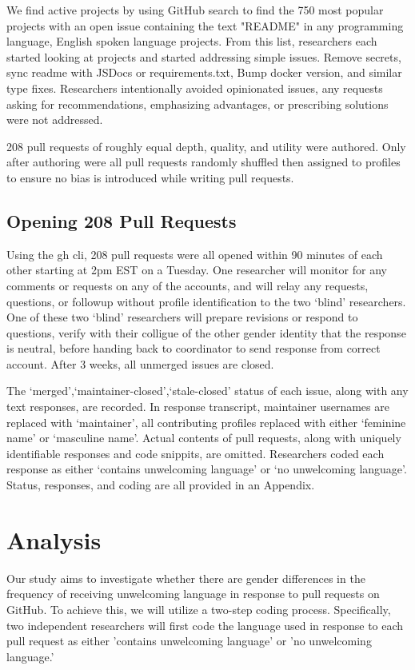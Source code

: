 \documentclass[journal,12pt,onecolumn,]{IEEEtran}
\begin{document}
We find active projects by using GitHub search to find the 750 most popular projects with an open issue containing the text "README" in any programming language, English spoken language projects.
From this list, researchers each started looking at projects and started addressing simple issues.
Remove secrets, sync readme with JSDocs or requirements.txt, Bump docker version, and similar type fixes.
Researchers intentionally avoided opinionated issues, any requests asking for recommendations, emphasizing advantages, or prescribing solutions were not addressed.

208 pull requests of roughly equal depth, quality, and utility were authored.
Only after authoring were all pull requests randomly shuffled then assigned to profiles to ensure no bias is introduced while writing pull requests.

\subsection{Opening 208 Pull Requests}

Using the gh cli, 208 pull requests were all opened within 90 minutes of each other starting at 2pm EST on a Tuesday.
One researcher will monitor for any comments or requests on any of the accounts, and will relay any requests, questions, or followup without profile identification to the two `blind' researchers.
One of these two `blind' researchers will prepare revisions or respond to questions, verify with their colligue of the other gender identity that the response is neutral, before handing back to coordinator to send response from correct account.
After 3 weeks, all unmerged issues are closed.

The `merged',`maintainer-closed',`stale-closed' status of each issue, along with any text responses, are recorded.
In response transcript, maintainer usernames are replaced with `maintainer', all contributing profiles replaced with either `feminine name' or `masculine name'.
Actual contents of pull requests, along with uniquely identifiable responses and code snippits, are omitted.
Researchers coded each response as either `contains unwelcoming language' or `no unwelcoming language'.
Status, responses, and coding are all provided in an Appendix.

\section{Analysis}

Our study aims to investigate whether there are gender differences in the frequency of receiving unwelcoming language in response to pull requests on GitHub. To achieve this, we will utilize a two-step coding process. Specifically, two independent researchers will first code the language used in response to each pull request as either 'contains unwelcoming language' or 'no unwelcoming language.'
\end{document}
